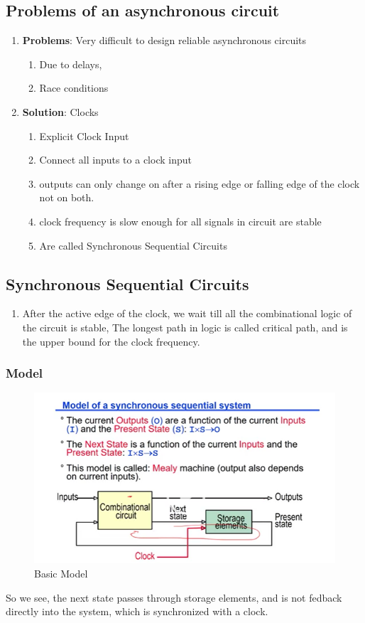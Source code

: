 \documentclass[11pt, a4paper]{article}
\begin{document}
\subsection{Problems of an asynchronous circuit}
\begin{enumerate}
    \item \textbf{Problems}:
    Very difficult to design reliable asynchronous circuits
    \begin{enumerate}
        \item Due to delays,
        \item Race conditions
    \end{enumerate}
    \item \textbf{Solution}: Clocks
    \begin{enumerate}
        \item Explicit Clock Input
        \item Connect all inputs to a clock input
        \item outputs can only change on after a rising edge or falling edge of the clock not on both.
        \item clock frequency is slow enough for all signals in circuit are stable
        \item Are called Synchronous Sequential Circuits
    \end{enumerate}
\end{enumerate}

\subsection{Synchronous Sequential Circuits}
\begin{enumerate}
    \item After the active edge of the clock, we wait till all the combinational logic of the circuit is stable, The longest path in logic is called critical path, and is the upper bound for the clock frequency.
\end{enumerate}
\subsubsection{Model}
\begin{figure}[H]
    \centering
    \includegraphics[width = \textwidth]{Pictures/Model of Synchronous Sequential Circuit.png}
    \caption{Basic Model}
\end{figure}
So we see, the next state passes through storage elements, and is not fedback directly into the system, which is synchronized with a clock.
\end{document}
